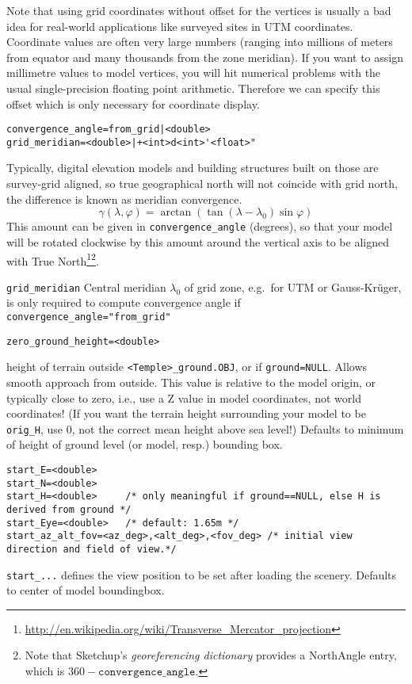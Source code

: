 \documentclass[a4paper]{article}
\newcommand{\filename}[1]{\texttt{#1}}
\begin{document}
Note that using grid coordinates without offset for the vertices is
usually a bad idea for real-world applications like surveyed sites in
UTM coordinates. Coordinate values are often very large numbers
(ranging into millions of meters from equator and many thousands from
the zone meridian). If you want to assign millimetre values to model
vertices, you will hit numerical problems with the usual
single-precision floating point arithmetic. Therefore we can specify
this offset which is only necessary for coordinate display.

\begin{verbatim}
convergence_angle=from_grid|<double> 
grid_meridian=<double>|+<int>d<int>'<float>"      
\end{verbatim}
Typically, digital elevation models and building structures built on those are
survey-grid aligned, so true geographical north will not coincide with grid
north, the difference is known as meridian convergence.
\begin{equation}
\gamma(\lambda, \varphi)=\arctan(\tan(\lambda-\lambda_0)\sin\varphi)
\end{equation}
This amount can be given in \verb|convergence_angle| (degrees), so
that your model will be rotated clockwise by this amount around
the vertical axis to be aligned with True North\footnote{%
  \url{http://en.wikipedia.org/wiki/Transverse_Mercator_projection}}\footnote{Note that Sketchup's \emph{georeferencing dictionary} provides a NorthAngle entry, which is $360-\mathtt{convergence\_angle}$.}. 

\verb|grid_meridian| Central
meridian $\lambda_0$ of grid zone, e.g.\ for UTM or Gauss-Kr\"uger,
 is only required to compute convergence angle if
\verb|convergence_angle="from_grid"|

\begin{verbatim}
zero_ground_height=<double> 
\end{verbatim}
height of terrain outside \filename{<Temple>\_ground.OBJ}, or if \verb|ground=NULL|.
Allows smooth approach from outside.  This value is relative to the model
origin, or typically close to zero, i.e.,  use a Z value in model coordinates,
not world coordinates! (If you want the terrain height surrounding your model to
be \verb|orig_H|, use 0, not the correct mean height above sea level!)  Defaults
to minimum of height of ground level (or model, resp.) bounding box.

\begin{verbatim}
start_E=<double> 
start_N=<double> 
start_H=<double>     /* only meaningful if ground==NULL, else H is derived from ground */
start_Eye=<double>   /* default: 1.65m */
start_az_alt_fov=<az_deg>,<alt_deg>,<fov_deg> /* initial view direction and field of view.*/
\end{verbatim}
\verb|start_...| defines the view position to be set after loading the scenery.
Defaults to center of model boundingbox.
\end{document}
